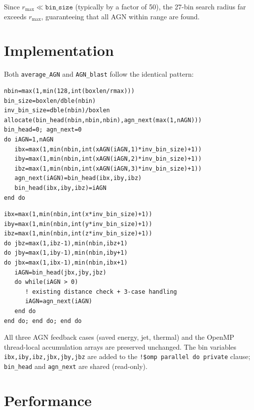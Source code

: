\documentclass[11pt,fleqn]{book}
\begin{document}
Since $r_\mathrm{max} \ll \texttt{bin\_size}$ (typically by a factor of 50), the 27-bin search radius far exceeds $r_\mathrm{max}$, guaranteeing that all AGN within range are found.

\section{Implementation}

Both \texttt{average\_AGN} and \texttt{AGN\_blast} follow the identical pattern:

\begin{codebox}
\begin{lstlisting}[style=fortran]
nbin=max(1,min(128,int(boxlen/rmax)))
bin_size=boxlen/dble(nbin)
inv_bin_size=dble(nbin)/boxlen
allocate(bin_head(nbin,nbin,nbin),agn_next(max(1,nAGN)))
bin_head=0; agn_next=0
do iAGN=1,nAGN
   ibx=max(1,min(nbin,int(xAGN(iAGN,1)*inv_bin_size)+1))
   iby=max(1,min(nbin,int(xAGN(iAGN,2)*inv_bin_size)+1))
   ibz=max(1,min(nbin,int(xAGN(iAGN,3)*inv_bin_size)+1))
   agn_next(iAGN)=bin_head(ibx,iby,ibz)
   bin_head(ibx,iby,ibz)=iAGN
end do
\end{lstlisting}
\end{codebox}

\begin{codebox}[Cell inner loop (replaces \texttt{do iAGN=1,nAGN})]
\begin{lstlisting}[style=fortran]
ibx=max(1,min(nbin,int(x*inv_bin_size)+1))
iby=max(1,min(nbin,int(y*inv_bin_size)+1))
ibz=max(1,min(nbin,int(z*inv_bin_size)+1))
do jbz=max(1,ibz-1),min(nbin,ibz+1)
do jby=max(1,iby-1),min(nbin,iby+1)
do jbx=max(1,ibx-1),min(nbin,ibx+1)
   iAGN=bin_head(jbx,jby,jbz)
   do while(iAGN > 0)
      ! existing distance check + 3-case handling
      iAGN=agn_next(iAGN)
   end do
end do; end do; end do
\end{lstlisting}
\end{codebox}

All three AGN feedback cases (saved energy, jet, thermal) and the OpenMP thread-local accumulation arrays are preserved unchanged. The bin variables \texttt{ibx,iby,ibz,jbx,jby,jbz} are added to the \texttt{!\$omp~parallel~do~private} clause; \texttt{bin\_head} and \texttt{agn\_next} are shared (read-only).

\section{Performance}
\end{document}
